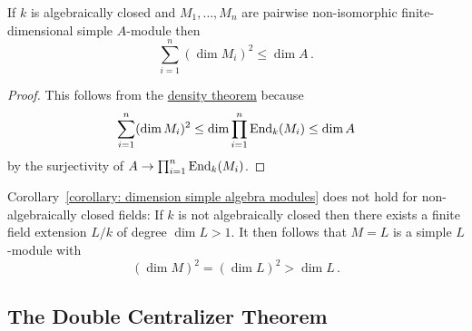 \begin{corollary}
  \label{corollary: dimension simple algebra modules}
  If $k$ is algebraically closed and $M_1, \dotsc, M_n$ are pairwise non-iso\-morphic finite-dimensional simple $A$-module then
  \[
          \sum_{i=1}^n (\dim M_i)^2
    \leq  \dim A \,.
  \]
\end{corollary}


\begin{proof}
  This follows from the \hyperref[theorem: density theorem]{density theorem} because
  \[
          \sum_{i=1}^n (\dim M_i)^2
    \leq  \dim \prod_{i=1}^n \operatorname{End}_k(M_i)
    \leq  \dim A
  \]
  by the surjectivity of $A \to \prod_{i=1}^n \operatorname{End}_k(M_i)$.
\end{proof}


\begin{remark}
  Corollary~\ref{corollary: dimension simple algebra modules} does not hold for non-algebraically closed fields:
  If $k$ is not algebraically closed then there exists a finite field extension $L/k$ of degree $\dim L > 1$.
  It then follows that $M = L$ is a simple $L$-module with
  \[
      (\dim M)^2
    = (\dim L)^2
    > \dim L \,.
  \]
\end{remark}





\subsection*{The Double Centralizer Theorem}


